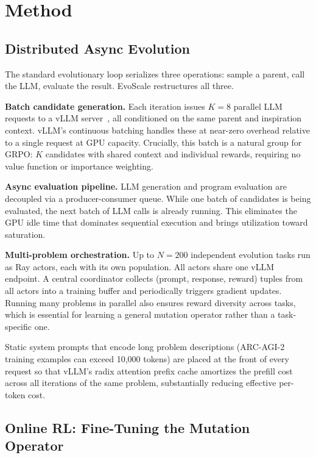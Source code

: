\documentclass{article}
\begin{document}
\section*{Method}

\subsection*{Distributed Async Evolution}

The standard evolutionary loop serializes three operations: sample a
parent, call the LLM, evaluate the result. EvoScale restructures all
three.

\textbf{Batch candidate generation.} Each iteration issues $K = 8$
parallel LLM requests to a vLLM server~\cite{vllm}, all conditioned on the
same parent and inspiration context. vLLM's continuous batching handles
these at near-zero overhead relative to a single request at GPU capacity.
Crucially, this batch is a natural group for GRPO: $K$ candidates with
shared context and individual rewards, requiring no value function or
importance weighting.

\textbf{Async evaluation pipeline.} LLM generation and program evaluation
are decoupled via a producer-consumer queue. While one batch of candidates
is being evaluated, the next batch of LLM calls is already running. This
eliminates the GPU idle time that dominates sequential execution and brings
utilization toward saturation.

\textbf{Multi-problem orchestration.} Up to $N = 200$ independent
evolution tasks run as Ray actors, each with its own population. All
actors share one vLLM endpoint. A central coordinator collects
(prompt, response, reward) tuples from all actors into a training
buffer and periodically triggers gradient updates. Running many
problems in parallel also ensures reward diversity across tasks,
which is essential for learning a general mutation operator rather
than a task-specific one.

Static system prompts that encode long problem descriptions (ARC-AGI-2
training examples can exceed 10{,}000 tokens) are placed at the front of
every request so that vLLM's radix attention prefix cache amortizes the
prefill cost across all iterations of the same problem, substantially
reducing effective per-token cost.

\subsection*{Online RL: Fine-Tuning the Mutation Operator}
\end{document}

